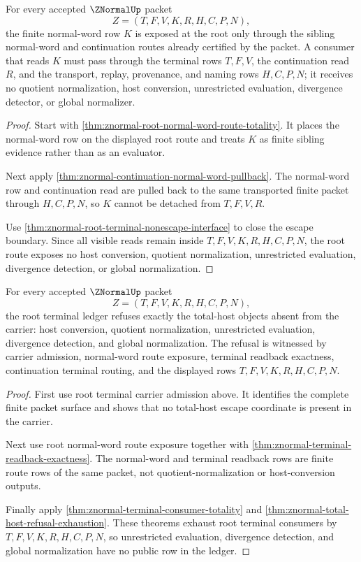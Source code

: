 \begin{theorem}
\label{thm:znormal-root-normal-word-route-exposure}
For every accepted $\ZNormalUp$ packet
$$
Z=(T,F,V,K,R,H,C,P,N),
$$
the finite normal-word row $K$ is exposed at the root only through the sibling normal-word and continuation routes already certified by the packet. A consumer that reads $K$ must pass through the terminal rows $T,F,V$, the continuation read $R$, and the transport, replay, provenance, and naming rows $H,C,P,N$; it receives no quotient normalization, host conversion, unrestricted evaluation, divergence detector, or global normalizer.
\end{theorem}
\begin{proof}
Start with \autoref{thm:znormal-root-normal-word-route-totality}. It places the normal-word row on the displayed root route and treats $K$ as finite sibling evidence rather than as an evaluator.

Next apply \autoref{thm:znormal-continuation-normal-word-pullback}. The normal-word row and continuation read are pulled back to the same transported finite packet through $H,C,P,N$, so $K$ cannot be detached from $T,F,V,R$.

Use \autoref{thm:znormal-root-terminal-nonescape-interface} to close the escape boundary. Since all visible reads remain inside $T,F,V,K,R,H,C,P,N$, the root route exposes no host conversion, quotient normalization, unrestricted evaluation, divergence detection, or global normalization.
\end{proof}

\begin{theorem}
\label{thm:znormal-root-total-host-refusal-ledger}
For every accepted $\ZNormalUp$ packet
$$
Z=(T,F,V,K,R,H,C,P,N),
$$
the root terminal ledger refuses exactly the total-host objects absent from the carrier: host conversion, quotient normalization, unrestricted evaluation, divergence detection, and global normalization. The refusal is witnessed by carrier admission, normal-word route exposure, terminal readback exactness, continuation terminal routing, and the displayed rows $T,F,V,K,R,H,C,P,N$.
\end{theorem}
\begin{proof}
First use root terminal carrier admission above. It identifies the complete finite packet surface and shows that no total-host escape coordinate is present in the carrier.

Next use root normal-word route exposure together with \autoref{thm:znormal-terminal-readback-exactness}. The normal-word and terminal readback rows are finite route rows of the same packet, not quotient-normalization or host-conversion outputs.

Finally apply \autoref{thm:znormal-terminal-consumer-totality} and \autoref{thm:znormal-total-host-refusal-exhaustion}. These theorems exhaust root terminal consumers by $T,F,V,K,R,H,C,P,N$, so unrestricted evaluation, divergence detection, and global normalization have no public row in the ledger.
\end{proof}
